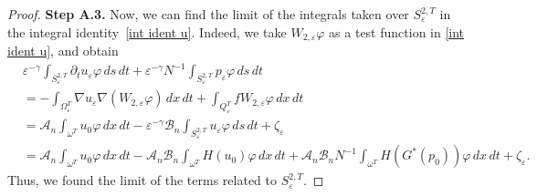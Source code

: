 \documentclass[10pt,a4paper]{amsart}
\numberwithin{equation}{section}
\begin{document}
\begin{proof}
\noindent\textbf{Step A.3.}
Now, we can find the limit of the integrals taken over $S_{\varepsilon }^{2,T}$ 
in the integral identity~\eqref{int ident u}.
Indeed, we take $W_{2,\varepsilon }\varphi $ as a test function in 
\eqref{int ident u}, and obtain
\begin{equation}
\begin{aligned}
&\varepsilon ^{-\gamma }\int _{S_{\varepsilon }^{2,T}}\partial
_{t}u_{\varepsilon }\varphi \,ds\,dt+\varepsilon ^{-\gamma }N^{-1}\int
_{S_{\varepsilon }^{2,T}}p_{\varepsilon }\varphi \,ds\,dt \\
&=-\int_{\Omega _{\varepsilon }^{T}}\nabla u_{\varepsilon }\nabla
(W_{2,\varepsilon }\varphi )\,dx\,dt+\int _{Q_{\varepsilon
}^{T}}fW_{2,\varepsilon }\varphi \,dx\,dt    \\
&=\mathcal{A}_n\int _{\omega ^{T}}u_0\varphi \,dx\,dt-\varepsilon
^{-\gamma }\mathcal{B}_n\int _{S_{\varepsilon
}^{2,T}}u_{\varepsilon }\varphi \,ds\,dt+\zeta _{\varepsilon }    \\
&=\mathcal{A}_n\int _{\omega ^{T}}u_0\varphi \,dx\,dt-\mathcal{A}_n%
\mathcal{B}_n\int _{\omega ^{T}}H(u_0)\varphi \,dx\,dt+\mathcal{A}%
_n\mathcal{B}_nN^{-1}\int _{\omega ^{T}}H(G^{\ast
}(p_0))\varphi \,dx\,dt+\zeta _{\varepsilon }.
\end{aligned}  \label{pa_t u conv control}
\end{equation}
Thus, we found the limit of the terms related to $S_{\varepsilon }^{2,T}$.
\smallskip


\end{proof}
\end{document}
